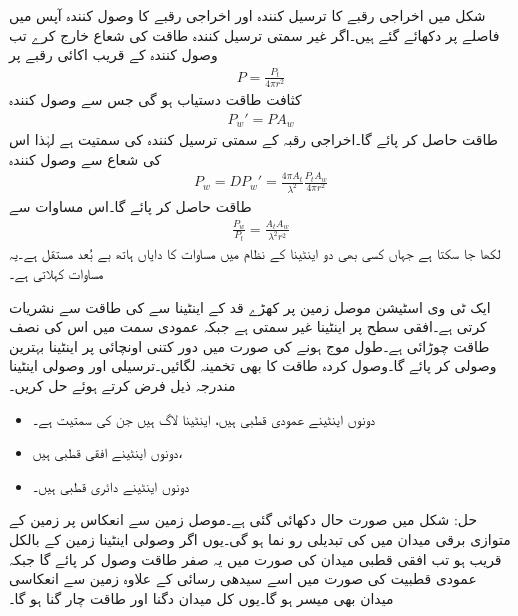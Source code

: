 شکل میں  اخراجی رقبے کا ترسیل کنندہ  اور  اخراجی رقبے کا وصول کنندہ آپس میں  فاصلے پر دکھائے گئے ہیں۔اگر غیر سمتی ترسیل کنندہ   طاقت کی شعاع خارج کرے تب وصول کنندہ کے قریب اکائی رقبے پر 
\begin{align}
P=\frac{P_t}{4\pi r^2}
\end{align}
کثافت طاقت دستیاب ہو گی جس سے وصول کنندہ
\begin{align}
P_w'=P A_w
\end{align}
طاقت حاصل کر پائے گا۔اخراجی رقبہ  کے سمتی ترسیل کنندہ کی سمتیت  ہے لہٰذا اس کی شعاع سے وصول کنندہ
\begin{align}
P_w=D P_w'= \frac{4\pi A_t}{\lambda^2}\frac{P_t A_w}{4\pi r^2}
\end{align}
طاقت حاصل کر پائے گا۔اس مساوات سے
\begin{align}
\frac{P_w}{P_t}=\frac{A_t A_w}{\lambda^2 r^2}
\end{align}
لکھا جا سکتا ہے جہاں کسی بھی دو اینٹینا کے نظام میں مساوات کا دایاں ہاتھ بے بُعد مستقل ہے۔یہ مساوات  کہلاتی ہے۔

ایک ٹی وی اسٹیشن موصل زمین پر کھڑے  قد کے اینٹینا سے  کی طاقت سے نشریات کرتی ہے۔افقی سطح پر اینٹینا غیر سمتی ہے جبکہ عمودی سمت میں اس کی نصف طاقت چوڑائی  ہے۔طول موج  ہونے کی صورت میں  دور کتنی اونچائی پر اینٹینا بہترین وصولی کر پائے گا۔وصول کردہ طاقت کا بھی تخمینہ لگائیں۔ترسیلی اور وصولی اینٹینا مندرجہ ذیل فرض کرتے ہوئے حل کریں۔
\begin{itemize}
\item
دونوں اینٹینے عمودی قطبی ہیں، اینٹینا لاگ ہیں جن کی سمتیت  ہے۔
\item
دونوں اینٹینے افقی قطبی ہیں،
\item
دونوں اینٹینے دائری قطبی ہیں۔
\end{itemize}

حل: شکل میں صورت حال دکھائی گئی ہے۔موصل زمین سے انعکاس پر زمین کے متوازی برقی میدان میں  کی تبدیلی رو نما ہو گی۔یوں اگر وصولی اینٹینا زمین کے بالکل قریب ہو تب افقی قطبی میدان کی صورت میں یہ صفر طاقت وصول کر پائے گا جبکہ عمودی قطبیت کی صورت میں اسے سیدھی رسائی کے علاوہ زمین سے انعکاسی میدان بھی میسر ہو گا۔یوں کل میدان دگنا اور طاقت چار گنا ہو گا۔

